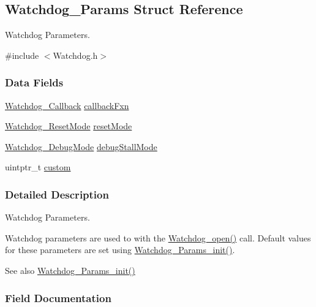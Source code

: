 \subsection{Watchdog\+\_\+\+Params Struct Reference}
\label{struct_watchdog___params}


Watchdog Parameters.  




{\ttfamily \#include $<$Watchdog.\+h$>$}

\subsubsection*{Data Fields}
\begin{DoxyCompactItemize}
\item 
\hyperlink{_watchdog_8h_abb9d5f385013e9950884200d8d05fd05}{Watchdog\+\_\+\+Callback} \hyperlink{struct_watchdog___params_a710aaa2504356ab3d3f9a27ac19ddb85}{callback\+Fxn}
\item 
\hyperlink{_watchdog_8h_ada0db7216129d7dad494bb0cd0169f88}{Watchdog\+\_\+\+Reset\+Mode} \hyperlink{struct_watchdog___params_a94b5d650f8beb7dce719360404039ccf}{reset\+Mode}
\item 
\hyperlink{_watchdog_8h_ab1aa5862661c88a16b9d7bc12709d51e}{Watchdog\+\_\+\+Debug\+Mode} \hyperlink{struct_watchdog___params_abe7792eef8afa2972a4625f428b7241b}{debug\+Stall\+Mode}
\item 
uintptr\+\_\+t \hyperlink{struct_watchdog___params_aa3c851cbea7d70fe033250ce64add537}{custom}
\end{DoxyCompactItemize}


\subsubsection{Detailed Description}
Watchdog Parameters. 

Watchdog parameters are used to with the \hyperlink{_watchdog_8h_aa5ce656aa6d5199e1efdb4ca2cd9fb7c}{Watchdog\+\_\+open()} call. Default values for these parameters are set using \hyperlink{_watchdog_8h_a6a6f54cfdac33d3bf33464a212262afc}{Watchdog\+\_\+\+Params\+\_\+init()}.

\begin{DoxySeeAlso}{See also}
\hyperlink{_watchdog_8h_a6a6f54cfdac33d3bf33464a212262afc}{Watchdog\+\_\+\+Params\+\_\+init()} 
\end{DoxySeeAlso}


\subsubsection{Field Documentation}
